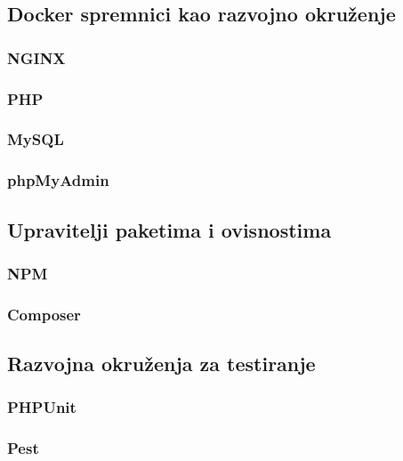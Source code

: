 \subsection{Docker spremnici kao razvojno okruženje}

\subsubsection{NGINX}

\subsubsection{PHP}

\subsubsection{MySQL}

\subsubsection{phpMyAdmin}

\subsection{Upravitelji paketima i ovisnostima}

\subsubsection{NPM}

\subsubsection{Composer}

\subsection{Razvojna okruženja za testiranje}

\subsubsection{PHPUnit}

\subsubsection{Pest}
